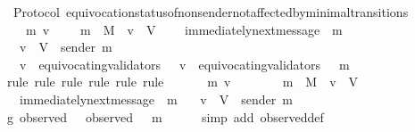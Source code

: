 \begin{isabellebody}
\isamarkupfalse%
\ {\isacharparenleft}\ Protocol{\isacharparenright}\ equivocation{\isacharunderscore}status{\isacharunderscore}of{\isacharunderscore}non{\isacharunderscore}sender{\isacharunderscore}not{\isacharunderscore}affected{\isacharunderscore}by{\isacharunderscore}minimal{\isacharunderscore}transitions\ {\isacharcolon}\isanewline
\ \ {\isachardoublequoteopen}{\isasymforall}\ {\isasymsigma}\ m\ v{\isachardot}\ {\isasymsigma}\ {\isasymin}\ {\isasymSigma}\ {\isasymand}\ m\ {\isasymin}\ M\ {\isasymand}\ v\ {\isasymin}\ V\ \isanewline
\ \ {\isasymlongrightarrow}\ immediately{\isacharunderscore}next{\isacharunderscore}message\ {\isacharparenleft}{\isasymsigma}{\isacharcomma}\ m{\isacharparenright}\isanewline
\ \ {\isasymlongrightarrow}\ v\ {\isasymin}\ V\ {\isacharminus}\ {\isacharbraceleft}sender\ m{\isacharbraceright}\isanewline
\ \ {\isasymlongrightarrow}\ v\ {\isasymin}\ equivocating{\isacharunderscore}validators\ {\isasymsigma}\ {\isasymlongleftrightarrow}\ v\ {\isasymin}\ equivocating{\isacharunderscore}validators\ {\isacharparenleft}{\isasymsigma}\ {\isasymunion}\ {\isacharbraceleft}m{\isacharbraceright}{\isacharparenright}{\isachardoublequoteclose}\isanewline
%
\isadelimproof
\ \ %
\endisadelimproof
%
\isatagproof
{}\isamarkupfalse%
\ {\isacharparenleft}rule{\isacharcomma}\ rule{\isacharcomma}\ rule{\isacharcomma}\ rule{\isacharcomma}\ rule{\isacharcomma}\ rule{\isacharparenright}\isanewline
{}\isamarkupfalse%
\ {\isacharminus}\isanewline
\ \ \isamarkupfalse%
\ {\isasymsigma}\ m\ v\isanewline
\ \ \isamarkupfalse%
\ {\isachardoublequoteopen}{\isasymsigma}\ {\isasymin}\ {\isasymSigma}\ {\isasymand}\ m\ {\isasymin}\ M\ {\isasymand}\ v\ {\isasymin}\ V{\isachardoublequoteclose}\isanewline
\ \ \ {\isachardoublequoteopen}immediately{\isacharunderscore}next{\isacharunderscore}message\ {\isacharparenleft}{\isasymsigma}{\isacharcomma}\ m{\isacharparenright}{\isachardoublequoteclose}\isanewline
\ \ \ {\isachardoublequoteopen}v\ {\isasymin}\ V\ {\isacharminus}\ {\isacharbraceleft}sender\ m{\isacharbraceright}{\isachardoublequoteclose}\isanewline
\ \ \isamarkupfalse%
\ \isamarkupfalse%
\ g{}{\isacharcolon}\ {\isachardoublequoteopen}observed\ {\isasymsigma}\ {\isasymsubseteq}\ observed\ {\isacharparenleft}{\isasymsigma}\ {\isasymunion}\ {\isacharbraceleft}m{\isacharbraceright}{\isacharparenright}{\isachardoublequoteclose}\isanewline
\ \ \ \ \isamarkupfalse%
\ {\isacharparenleft}simp\ add{\isacharcolon}\ observed{\isacharunderscore}def{\isacharparenright}\isanewline

\end{isabellebody}

